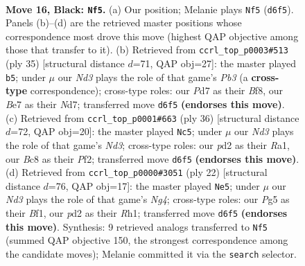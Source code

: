 \documentclass[11pt]{article}
\begin{document}
\clearpage

\begin{figure}[p]\centering
\begin{subfigure}{0.46\textwidth}\centering
\resizebox{\linewidth}{!}{%
\newchessgame
\chessboard[
  setfen={r1b3k1/ppppbp1p/3n4/6p1/8/BPN2P2/P1PPB1PP/R5K1 b - - 1 16},
  showmover=false,
  pgfstyle=straightmove, color=movearrow, markmove={d6-f5}
]}
\caption{}
\end{subfigure}\hfill
\begin{subfigure}{0.46\textwidth}\centering
\resizebox{\linewidth}{!}{%
\newchessgame
\chessboard[
  setfen={4kb1r/B2npppp/1pp5/7b/1nN5/1PN1PP2/1P3KPP/5B1R b k - 1 18},
  showmover=false,
  pgfstyle=straightmove, color=movearrow, markmove={b6-b5}
]}
\caption{}
\end{subfigure}
\\[4pt]
\begin{subfigure}{0.46\textwidth}\centering
\resizebox{\linewidth}{!}{%
\newchessgame
\chessboard[
  setfen={3r1k2/1pp2ppp/p1nn4/5b2/8/N1PN4/PPB2PPP/R5K1 w - - 5 19},
  showmover=false,
  pgfstyle=straightmove, color=movearrow, markmove={d3-c5}
]}
\caption{}
\end{subfigure}\hfill
\begin{subfigure}{0.46\textwidth}\centering
\resizebox{\linewidth}{!}{%
\newchessgame
\chessboard[
  setfen={r1b1kb1r/pp2pp1p/6p1/n7/6N1/2P5/P2P1PPP/R1B1KB1R w KQkq - 0 12},
  showmover=false,
  pgfstyle=straightmove, color=movearrow, markmove={g4-e5}
]}
\caption{}
\end{subfigure}
\caption{\textbf{Move 16, Black: \texttt{Nf5}.} (a) Our position; Melanie plays \texttt{Nf5} (\texttt{d6f5}). Panels (b)--(d) are the retrieved master positions whose correspondence most drove this move (highest QAP objective among those that transfer to it). (b) Retrieved from \texttt{ccrl\_top\_p0003\#513} (ply 35) [structural distance $d$=71, QAP obj=27]: the master played \texttt{b5}; under $\mu$ our \emph{Nd3} plays the role of that game's \emph{Pb3} (a \textbf{cross-type} correspondence); cross-type roles: our \emph{P}d7 as their \emph{B}f8, our \emph{B}e7 as their \emph{N}d7; transferred move \texttt{d6f5} \textbf{(endorses this move)}. (c) Retrieved from \texttt{ccrl\_top\_p0001\#663} (ply 36) [structural distance $d$=72, QAP obj=20]: the master played \texttt{Nc5}; under $\mu$ our \emph{Nd3} plays the role of that game's \emph{Nd3}; cross-type roles: our \emph{p}d2 as their \emph{R}a1, our \emph{B}c8 as their \emph{P}f2; transferred move \texttt{d6f5} \textbf{(endorses this move)}. (d) Retrieved from \texttt{ccrl\_top\_p0000\#3051} (ply 22) [structural distance $d$=76, QAP obj=17]: the master played \texttt{Ne5}; under $\mu$ our \emph{Nd3} plays the role of that game's \emph{Ng4}; cross-type roles: our \emph{P}g5 as their \emph{B}f1, our \emph{p}d2 as their \emph{R}h1; transferred move \texttt{d6f5} \textbf{(endorses this move)}. Synthesis: 9 retrieved analogs transferred to \texttt{Nf5} (summed QAP objective 150, the strongest correspondence among the candidate moves); Melanie committed it via the \texttt{search} selector.}
\label{fig:thought-m31}
\end{figure}
\end{document}
